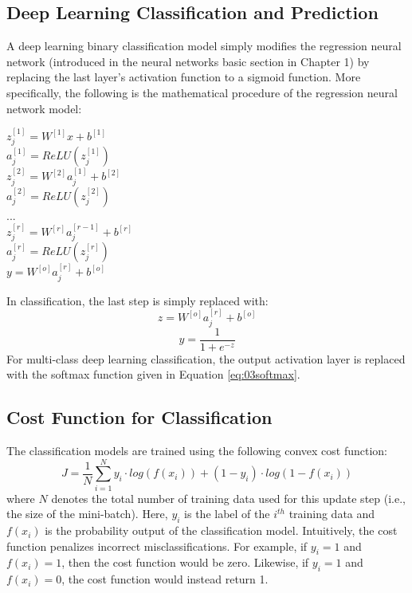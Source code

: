 \subsection{Deep Learning Classification and Prediction}
A deep learning binary classification model simply modifies the regression neural network (introduced in the neural networks basic section in Chapter 1) by replacing the last layer's activation function to a sigmoid function. More specifically, the following is the mathematical procedure of the regression neural network model:
\begin{center}
    $z^{[1]}_j = W^{[1]}x + b^{[1]}$ \\
    $a^{[1]}_j = ReLU(z^{[1]}_j)$ \\
    $z^{[2]}_j = W^{[2]}a^{[1]}_j + b^{[2]}$ \\
    $a^{[2]}_j = ReLU(z^{[2]}_j)$ \\
    ... \\
    $z^{[r]}_j = W^{[r]}a^{[r - 1]}_j + b^{[r]}$ \\
    $a^{[r]}_j = ReLU(z^{[r]}_j)$ \\
    $y = W^{[o]}a^{[r]}_j + b^{[o]}$ \\  
\end{center}
In classification, the last step is simply replaced with:
$$z = W^{[o]}a^{[r]}_j + b^{[o]}$$
\begin{equation}
    y = \frac{1}{1 + e^{-z}}
    \label{eq:03sigmoidact}
\end{equation}
For multi-class deep learning classification, the output activation layer is replaced with the softmax function given in Equation \ref{eq:03softmax}.

\subsection{Cost Function for Classification}
The classification models are trained using the following convex cost function:
\begin{equation}
    J = \frac{1}{N}\sum\limits^N_{i=1} y_i \cdot log(f(x_i)) + (1 - y_i) \cdot log(1 - f(x_i))
    \label{eq:03maxentropy}
\end{equation}
where $N$ denotes the total number of training data used for this update step (i.e., the size of the mini-batch).  Here, $y_i$ is the label of the $i^{th}$ training data and $f(x_i)$ is the probability output of the classification model.  Intuitively, the cost function penalizes incorrect misclassifications.  For example, if $y_i = 1$ and $f(x_i) = 1$, then the cost function would be zero.  Likewise, if $y_i = 1$ and $f(x_i) = 0$, the cost function would instead return 1.



